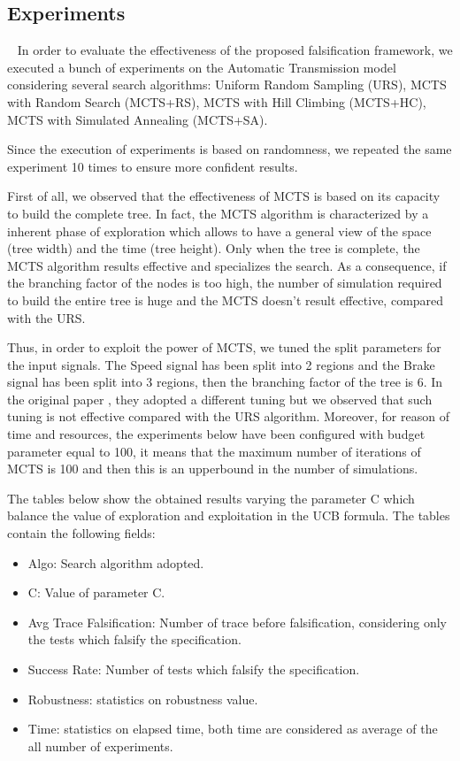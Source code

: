 \documentclass[11pt]{article}
\begin{document}
\pagebreak

\subsection{Experiments}~\label{sec:exp}
In order to evaluate the effectiveness of the proposed falsification framework, we executed a bunch of experiments on the Automatic Transmission model considering several search algorithms: Uniform Random Sampling (URS), MCTS with Random Search (MCTS+RS), MCTS with Hill Climbing (MCTS+HC), MCTS with Simulated Annealing (MCTS+SA).

Since the execution of experiments is based on randomness, we repeated the same experiment 10 times to ensure more confident results.

First of all, we observed that the effectiveness of MCTS is based on its capacity to build the complete tree. In fact, the MCTS algorithm is characterized by a inherent phase of exploration which allows to have a general view of the space (tree width) and the time (tree height). Only when the tree is complete, the MCTS algorithm results effective and specializes the search.
As a consequence, if the branching factor of the nodes is too high, the number of simulation required to build the entire tree is huge and the MCTS doesn't result effective, compared with the URS. 

Thus, in order to exploit the power of MCTS, we tuned the split parameters for the input signals. The Speed signal has been split into 2 regions and the Brake signal has been split into 3 regions, then the branching factor of the tree is 6. In the original paper \cite{zhang2018two}, they
adopted a different tuning but we observed that such tuning is not effective compared with the URS algorithm. Moreover, for reason of time and resources, the experiments below have been configured with budget parameter equal to 100, it means that the maximum number of iterations of MCTS is 100 and then this is an upperbound in the number of simulations.

The tables below show the obtained results varying the parameter C which balance the value of exploration and exploitation in the UCB formula. The tables contain the following fields:
\begin{itemize}
    \item Algo: Search algorithm adopted.
    \item C: Value of parameter C.
    \item Avg Trace Falsification: Number of trace before falsification, considering only the tests which falsify the specification.
    \item Success Rate: Number of tests which falsify the specification.
    \item Robustness: statistics on robustness value.
    \item Time: statistics on elapsed time, both time are considered as average of the all number of experiments.
\end{itemize}
\end{document}
